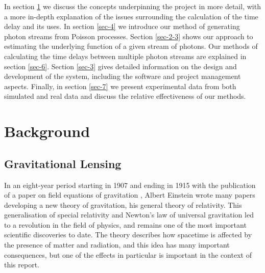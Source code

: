 \documentclass[a4paper,11pt]{article}
\begin{document}
In section \ref{sec-2} we discuss the concepts underpinning the project in more
detail, with a more in-depth explanation of the issues surrounding the
calculation of the time delay and its uses. In section \ref{sec-4} we introduce our method of generating photon streams from Poisson
processes. Section \ref{sec-2-3} shows our approach to estimating the
underlying function of a given stream of photons. Our methods of calculating the
time delays between multiple photon streams are explained in section \ref{sec-6}. Section \ref{sec-3} gives detailed information on the design and
development of the system, including the software and project management
aspects. Finally, in section \ref{sec-7} we present experimental data from both
simulated and real data and discuss the relative effectiveness of our methods.
\section{Background}
\label{sec-2}
\subsection{Gravitational Lensing}
\label{sec-2-1}

In an eight-year period starting in 1907 and ending in 1915 with the publication
of a paper on field equations of gravitation \cite{einstein1915general}, Albert
Einstein wrote many papers developing a new theory of gravitation, his general
theory of relativity. This generalisation of special relativity and Newton's law
of universal gravitation led to a revolution in the field of physics, and
remains one of the most important scientific discoveries to date. The theory
describes how spacetime is affected by the presence of matter and radiation, and
this idea has many important consequences, but one of the effects in particular
is important in the context of this report.
\end{document}
